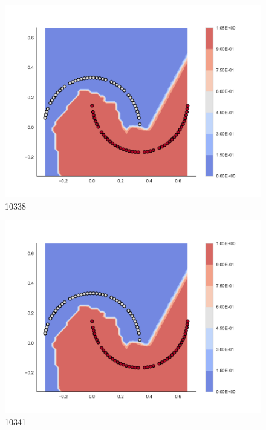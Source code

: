 \begin{subfigure}[b]{0.09\textwidth}
    \includegraphics[clip, trim=2.35cm 1.75cm 4.5cm 0cm,width=\textwidth]{img/convergence/10338.pdf}
    \caption{10338}
    \label{fig:convergence_10338}
\end{subfigure}
%
\begin{subfigure}[b]{0.09\textwidth}
    \includegraphics[clip, trim=2.35cm 1.75cm 4.5cm 0cm,width=\textwidth]{img/convergence/10341.pdf}
    \caption{10341}
    \label{fig:convergence_10341}
\end{subfigure}
%
